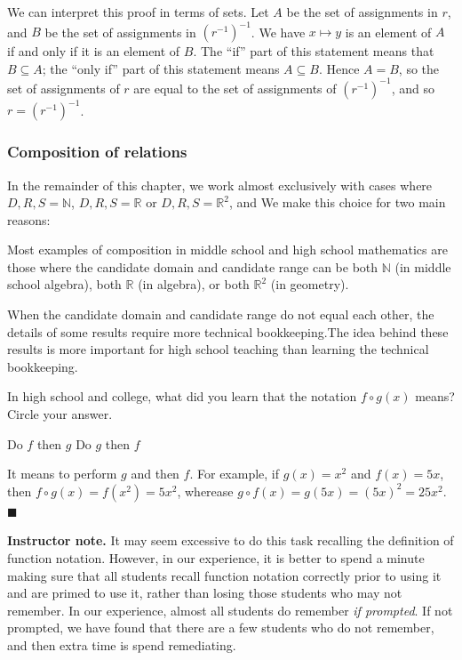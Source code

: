 \documentclass[11pt]{article}
\newcommand\smallnote[1]
	{\begin{mdframed}\raggedright  {\bf Instructor note.} {#1} \end{mdframed}}
\newenvironment{task}
	{\begin{mdframed}[linecolor=lightgray, linewidth=3pt]\raggedright}
	{\end{mdframed}}
\newcommand{\R}{\mathbb{R}}
\newcommand{\N}{\mathbb{N}}
\renewcommand\subset\subseteq
\theoremstyle{definition}
\newenvironment{solution}{{\it Solution.} }{\hfill {\color{lightgray}$\blacksquare$}}
\begin{document}
We can interpret this proof in terms of sets. Let $A$ be the set of assignments in $r$, and $B$ be the set of assignments in $(r^{-1})^{-1}$. We have $x\mapsto y$ is an element of $A$ if and only if it is an element of $B$. The ``if'' part of this statement means that $B\subset A$; the ``only if'' part of this statement means $A\subset B$. Hence $A=B$, so the set of assignments of $r$ are equal to the set of assignments of $(r^{-1})^{-1}$, and so $r=(r^{-1})^{-1}$.

\subsubsection{Composition of relations}
\label{s: composition}

In the remainder of this chapter, we work almost exclusively with cases where  $D, R, S = \N$, $D, R, S = \R$ or $D, R, S=\R^2$, and We make this choice for two main reasons:
	\begin{itemize*}
	\item Most examples of composition in middle school and high school mathematics are those where the candidate domain and candidate range can be both $\N$ (in middle school algebra), both $\R$ (in algebra), or both $\R^2$ (in geometry).
	\item When the candidate domain and candidate range do not equal each other, the details of some results require more technical bookkeeping.The idea behind these results is more important for high school teaching than learning the technical bookkeeping.
	\end{itemize*}

\begin{task}
In high school and college, what did you learn that the notation $f\circ g(x)$ means? Circle your answer.
\centerline{Do $f$ then $g$ \quad\quad\quad Do $g$ then $f$}
\end{task}

\begin{solution}
It means to perform $g$ and then $f$. For example, if $g(x)=x^2$ and $f(x)=5x$, then $f\circ g(x)=f(x^2)=5x^2$, wherease $g\circ f(x)=g(5x)=(5x)^2=25x^2$.
\end{solution}

\smallnote{It may seem excessive to do this task recalling the definition of function notation. However, in our experience, it is better to spend a minute making sure that all students recall function notation correctly prior to using it and are primed to use it, rather than losing those students who may not remember. In our experience, almost all students do remember {\it if prompted}. If not prompted, we have found that there are a few students who do not remember, and then extra time is spend remediating.}
\end{document}
